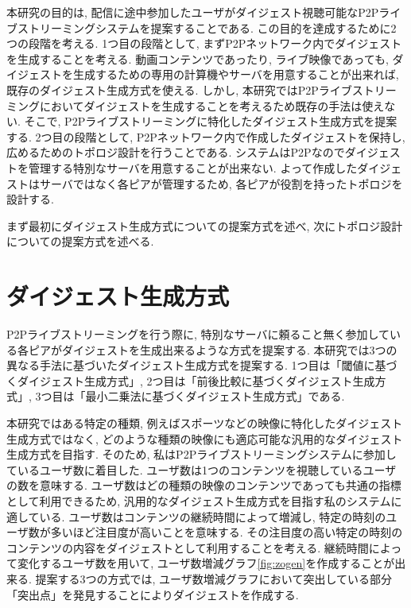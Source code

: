 本研究の目的は, 配信に途中参加したユーザがダイジェスト視聴可能なP2Pライブストリーミングシステムを提案することである. この目的を達成するために2つの段階を考える. 1つ目の段階として, まずP2Pネットワーク内でダイジェストを生成することを考える. 動画コンテンツであったり, ライブ映像であっても, ダイジェストを生成するための専用の計算機やサーバを用意することが出来れば, 既存のダイジェスト生成方式を使える. しかし, 本研究ではP2Pライブストリーミングにおいてダイジェストを生成することを考えるため既存の手法は使えない. そこで, P2Pライブストリーミングに特化したダイジェスト生成方式を提案する. 2つ目の段階として, P2Pネットワーク内で作成したダイジェストを保持し, 広めるためのトポロジ設計を行うことである. システムはP2Pなのでダイジェストを管理する特別なサーバを用意することが出来ない. よって作成したダイジェストはサーバではなく各ピアが管理するため, 各ピアが役割を持ったトポロジを設計する.


まず最初にダイジェスト生成方式についての提案方式を述べ, 次にトポロジ設計についての提案方式を述べる.
\section{ダイジェスト生成方式}
P2Pライブストリーミングを行う際に, 特別なサーバに頼ること無く参加している各ピアがダイジェストを生成出来るような方式を提案する. 本研究では3つの異なる手法に基づいたダイジェスト生成方式を提案する. 1つ目は「閾値に基づくダイジェスト生成方式」, 2つ目は「前後比較に基づくダイジェスト生成方式」, 3つ目は「最小二乗法に基づくダイジェスト生成方式」である.

本研究ではある特定の種類, 例えばスポーツなどの映像に特化したダイジェスト生成方式ではなく, どのような種類の映像にも適応可能な汎用的なダイジェスト生成方式を目指す. そのため, 私はP2Pライブストリーミングシステムに参加しているユーザ数に着目した. ユーザ数は1つのコンテンツを視聴しているユーザの数を意味する. ユーザ数はどの種類の映像のコンテンツであっても共通の指標として利用できるため, 汎用的なダイジェスト生成方式を目指す私のシステムに適している. ユーザ数はコンテンツの継続時間によって増減し, 特定の時刻のユーザ数が多いほど注目度が高いことを意味する. その注目度の高い特定の時刻のコンテンツの内容をダイジェストとして利用することを考える. 継続時間によって変化するユーザ数を用いて, ユーザ数増減グラフ\ref{fig:zogen}を作成することが出来る. 提案する3つの方式では, ユーザ数増減グラフにおいて突出している部分「突出点」を発見することによりダイジェストを作成する.

